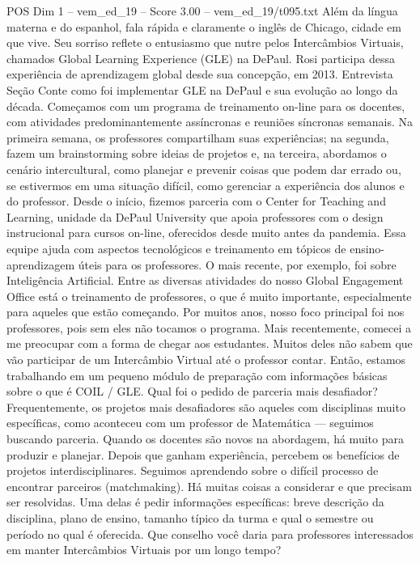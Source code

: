 \begin{textsample}{POS Dim 1 – vem\_ed\_19 – Score 3.00 – vem\_ed\_19/t095.txt}
Além da língua materna e do espanhol, fala rápida e claramente o inglês de Chicago, cidade em que vive.
Seu sorriso reflete o entusiasmo que nutre pelos Intercâmbios Virtuais, chamados Global Learning Experience (GLE) na DePaul.
Rosi participa dessa experiência de aprendizagem global desde sua concepção, em 2013.
Entrevista Seção Conte como foi implementar GLE na DePaul e sua evolução ao longo da década.
Começamos com um programa de treinamento on-line para os docentes, com atividades predominantemente assíncronas e reuniões síncronas semanais.
Na primeira semana, os professores compartilham suas experiências; na segunda, fazem um brainstorming sobre ideias de projetos e, na terceira, abordamos o cenário intercultural, como planejar e prevenir coisas que podem dar errado ou, se estivermos em uma situação difícil, como gerenciar a experiência dos alunos e do professor.
Desde o início, fizemos parceria com o Center for Teaching and Learning, unidade da DePaul University que apoia professores com o design instrucional para cursos on-line, oferecidos desde muito antes da pandemia.
Essa equipe ajuda com aspectos tecnológicos e treinamento em tópicos de ensino-aprendizagem úteis para os professores.
O mais recente, por exemplo, foi sobre Inteligência Artificial.
Entre as diversas atividades do nosso Global Engagement Office está o treinamento de professores, o que é muito importante, especialmente para aqueles que estão começando.
Por muitos anos, nosso foco principal foi nos professores, pois sem eles não tocamos o programa.
Mais recentemente, comecei a me preocupar com a forma de chegar aos estudantes.
Muitos deles não sabem que vão participar de um Intercâmbio Virtual até o professor contar.
Então, estamos trabalhando em um pequeno módulo de preparação com informações básicas sobre o que é COIL / GLE.
Qual foi o pedido de parceria mais desafiador?
Frequentemente, os projetos mais desafiadores são aqueles com disciplinas muito específicas, como aconteceu com um professor de Matemática — seguimos buscando parceria.
Quando os docentes são novos na abordagem, há muito para produzir e planejar.
Depois que ganham experiência, percebem os benefícios de projetos interdisciplinares.
Seguimos aprendendo sobre o difícil processo de encontrar parceiros (matchmaking).
Há muitas coisas a considerar e que precisam ser resolvidas.
Uma delas é pedir informações específicas: breve descrição da disciplina, plano de ensino, tamanho típico da turma e qual o semestre ou período no qual é oferecida.
Que conselho você daria para professores interessados em manter Intercâmbios Virtuais por um longo tempo?

\end{textsample}
